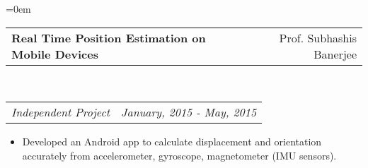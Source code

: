 \documentclass{article}
\makeatletter
\newcommand{\headerrow}[2]
{\begin{tabular*}{\linewidth}{l@{\extracolsep{\fill}}r}
	#1 &
	#2 \\
\end{tabular*}}
\makeatother
\begin{document}
\begin{list} {}{\leftmargin=0em}
\begin{itemize}
      \end{itemize}


\item[]
  \item[]
  \headerrow
  {\textbf{Real Time Position Estimation on Mobile Devices}}
  {Prof. Subhashis Banerjee}
  \\
  \headerrow
    {\emph{Independent Project}}
    {\emph{January, 2015 - May, 2015}}

    \begin{itemize}
      \item Developed an Android app to calculate displacement and orientation accurately from accelerometer, gyroscope, magnetometer (IMU sensors).


\end{itemize}
\end{list}
\end{document}
